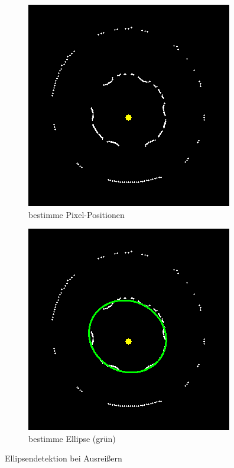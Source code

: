 \begin{figure}[!htb]
	\centering
	\begin{subfigure}{.46\textwidth}
		\centering
		\includegraphics[width=.9\textwidth]{images/rayCastRobust.png}
		\caption{bestimme Pixel-Positionen}
		\label{fig:rayCastRWOE}
	\end{subfigure}%
	\begin{subfigure}{.46\textwidth}
		\centering
		\includegraphics[width=.9\textwidth]{images/rayCastRobustEllipse.png}
		\caption{bestimme Ellipse (grün)}
		\label{fig:rayCastRWE}
	\end{subfigure}
	\caption{Ellipsendetektion bei Ausreißern}
	\label{fig:rayCastR}
\end{figure}


